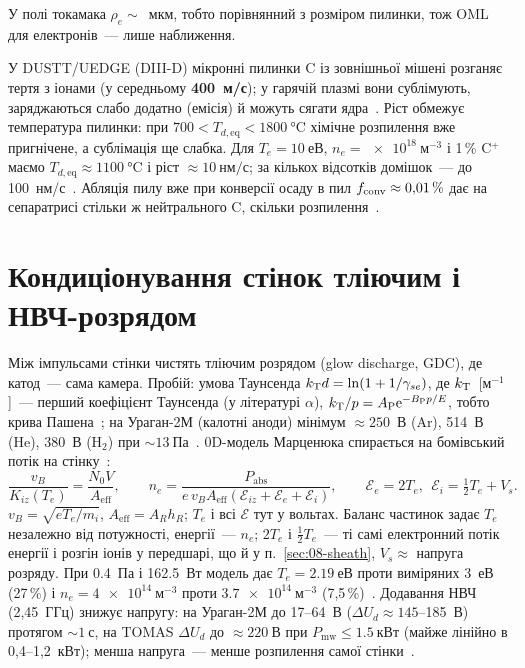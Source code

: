 \begin{outofcorpus}
У полі токамака $\rho_e\sim$~мкм, тобто порівнянний з розміром пилинки, тож OML для електронів~--- лише наближення.
\end{outofcorpus}

\begin{corpusexample}
У DUSTT/UEDGE (DIII-D) мікронні пилинки C із зовнішньої мішені розганяє тертя з іонами (у середньому \textbf{400~м/с}); у гарячій плазмі вони сублімують, заряджаються слабо додатно (емісія) й можуть сягати ядра~\cite[с.~5--6]{Pigarov2006}. Ріст обмежує температура пилинки: при $700<T_{d,\mathrm{eq}}<\SI{1800}{\degreeCelsius}$ хімічне розпилення вже пригнічене, а сублімація ще слабка. Для $T_e=\SI{10}{еВ}$, $n_e=\SI{e18}{м^{-3}}$ і 1\,\% C$^+$ маємо $T_{d,\mathrm{eq}}\approx\SI{1100}{\degreeCelsius}$ і ріст $\approx\SI{10}{нм/с}$; за кількох відсотків домішок~--- до \SI{100}{нм/с}~\cite[с.~6--7]{Pigarov2006}. Абляція пилу вже при конверсії осаду в пил $f_{\mathrm{conv}}\approx0{,}01\,\%$ дає на сепаратрисі стільки ж нейтрального C, скільки розпилення~\cite[с.~9]{Pigarov2006}.
\end{corpusexample}

\section{Кондиціонування стінок тліючим і НВЧ-розрядом}\label{sec:08-gdc}

Між імпульсами стінки чистять тліючим розрядом (glow discharge, GDC), де катод~--- сама камера. Пробій: умова Таунсенда $k_{\mathrm{T}} d=\ln(1+1/\gamma_{se})$, де $k_{\mathrm{T}}$~[м$^{-1}$]~--- перший коефіцієнт Таунсенда (у літературі $\alpha$), $k_{\mathrm{T}}/p=A_{\mathrm P}\mathrm{e}^{-B_{\mathrm P}p/E}$, тобто крива Пашена~\cite[с.~54, (2.1), (2.3)]{Martsenyuk2025}; на Ураган-2М (калотні аноди) мінімум $\approx250$~В (Ar), 514~В (He), 380~В (H$_2$) при $\sim\SI{13}{Па}$~\cite[с.~52]{Martsenyuk2025}. 0D-модель Марценюка спирається на бомівський потік на стінку~\cite[с.~85, (3.1), (3.3)]{Martsenyuk2025}:
\begin{equation}\label{eq:08-global}
  \frac{v_B}{K_{iz}(T_e)}=\frac{N_0V}{A_{\mathrm{eff}}},\qquad
  n_e=\frac{P_{\mathrm{abs}}}{e\,v_BA_{\mathrm{eff}}(\mathcal E_{iz}+\mathcal E_e+\mathcal E_i)},\qquad
  \mathcal E_e=2T_e,\ \ \mathcal E_i=\tfrac12T_e+V_s .
\end{equation}
$v_B=\sqrt{eT_e/m_i}$, $A_{\mathrm{eff}}=A_Rh_R$; $T_e$ і всі $\mathcal E$ тут у вольтах. Баланс частинок задає $T_e$ незалежно від потужності, енергії~--- $n_e$; $2T_e$ і $\tfrac12T_e$~--- ті самі електронний потік енергії і розгін іонів у передшарі, що й у п.~\ref{sec:08-sheath}, $V_s\approx$ напруга розряду. При \SI{0,4}{Па} і \SI{162,5}{Вт} модель дає $T_e=\SI{2,19}{еВ}$ проти виміряних \SI{3}{еВ} (27\,\%) і $n_e=\SI{4e14}{м^{-3}}$ проти $\SI{3,7e14}{м^{-3}}$ (7,5\,\%)~\cite[с.~91]{Martsenyuk2025}. Додавання НВЧ (2,45~ГГц) знижує напругу: на Ураган-2М до 17--64~В ($\Delta U_d\approx145$--185~В) протягом $\sim\SI{1}{с}$, на TOMAS $\Delta U_d$ до $\approx\SI{220}{В}$ при $P_{\mathrm{mw}}\le\SI{1,5}{кВт}$ (майже лінійно в 0,4--1,2~кВт); менша напруга~--- менше розпилення самої стінки~\cite[с.~114]{Martsenyuk2025}.

